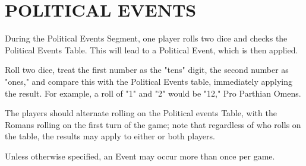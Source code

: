 \section{POLITICAL EVENTS}

During the Political Events Segment, one player rolls two dice and checks the Political Events Table. This will lead to a Political Event, which is then applied.

Roll two dice, treat the first number as the "tens" digit, the second number as "ones," and compare this with the Political Events table, immediately applying the result. For example, a roll of "1" and "2" would be "12," Pro Parthian Omens.

The players should alternate rolling on the Political events Table, with the Romans rolling on the first turn of the game; note that regardless of who rolls on the table, the results may apply to either or both players.

Unless otherwise specified, an Event may occur more than once per game.